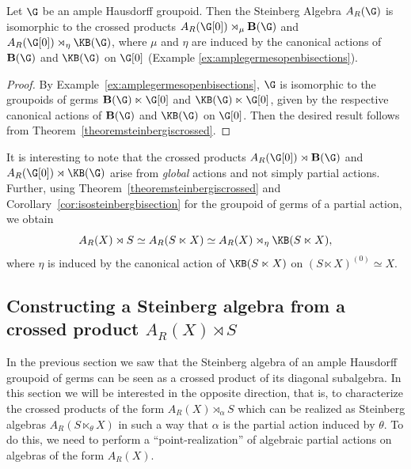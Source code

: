 \begin{corollary}\label{cor:isosteinbergbisection}
Let $\G$ be an ample Hausdorff groupoid. Then the Steinberg Algebra $A_R(\G)$ is isomorphic to the crossed products $A_R(\G[0])\rtimes_{\mu}\operatorname{\mathbf{B}}(\G)$ and $A_R(\G[0])\rtimes_{\eta}\KB(\G)$, where $\mu$ and $\eta$ are induced by the canonical actions of $\operatorname{\mathbf{B}}(\G)$ and $\KB(\G)$ on $\G[0]$ (Example \ref{ex:amplegermesopenbisections}).
\end{corollary}

\begin{proof}
By Example~\ref{ex:amplegermesopenbisections}, $\G$ is isomorphic to the groupoids of germs $\operatorname{\bf{B}}(\G)\ltimes\G[0]$ and $\KB(\G)\ltimes\G[0]$, given by the respective canonical actions of $\operatorname{\bf{B}}(\G)$ and $\KB(\G)$ on $\G[0]$. Then the desired result follows from Theorem~\ref{theoremsteinbergiscrossed}.
\end{proof}

It is interesting to note that the crossed products $A_R(\G[0])\rtimes\operatorname{\mathbf{B}}(\G)$ and $A_R(\G[0])\rtimes\KB(\G)$ arise from \emph{global} actions and not simply partial actions. Further, using Theorem~\ref{theoremsteinbergiscrossed} and Corollary~\ref{cor:isosteinbergbisection} for the groupoid of germs of a partial action, we obtain
\[A_R(X)\rtimes S\simeq A_R(S\ltimes X)\simeq A_R(X)\rtimes_\eta \KB(S\ltimes X),\]
where $\eta$ is induced by the canonical action of $\KB(S\ltimes X)$ on $(S\ltimes X)^{(0)}\simeq X$.

\subsection{Constructing a Steinberg algebra from a crossed product $A_R(X)\rtimes S$}

In the previous section we saw that the Steinberg algebra of an ample Hausdorff groupoid of germs can be seen as a crossed product of its diagonal subalgebra. In this section we will be interested in the opposite direction, that is, to characterize the crossed products of the form $A_R(X)\rtimes_{\alpha}S$ which can be realized as Steinberg algebras $A_R(S\ltimes_\theta X)$ in such a way that $\alpha$ is the partial action induced by $\theta$. To do this, we need to perform a ``point-realization'' of algebraic partial actions on algebras of the form $A_R(X)$.


